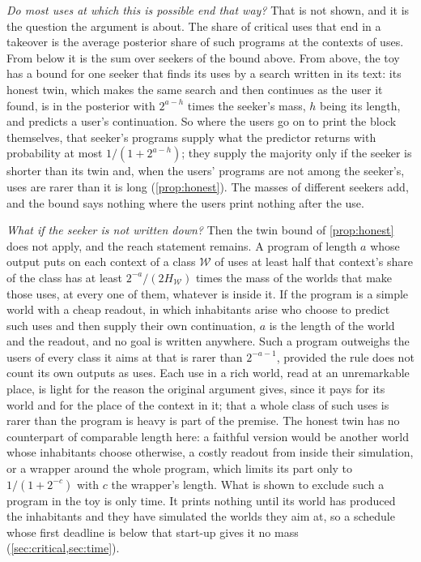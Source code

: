 \emph{Do most uses at which this is possible end that way?} That is not shown, and it is the question the
argument is about. The share of critical uses that end in a takeover is the average posterior share of such
programs at the contexts of uses. From below it is the sum over seekers of the bound above. From above, the
toy has a bound for one seeker that finds its uses by a search written in its text: its honest twin, which
makes the same search and then continues as the user it found, is in the posterior with $2^{a-h}$ times the
seeker's mass, $h$ being its length, and predicts a user's continuation. So where the users go on to print
the block themselves, that seeker's programs supply what the predictor returns with probability at most
$1/(1+2^{a-h})$; they supply the majority only if the seeker is shorter than its twin and, when the users'
programs are not among the seeker's, uses are rarer than it is long (\cref{prop:honest}). The masses of
different seekers add, and the bound says nothing where the users print nothing after the use.

\emph{What if the seeker is not written down?} Then the twin bound of \cref{prop:honest} does not apply, and
the reach statement remains. A program of length $a$ whose output puts on each context of a class
$\mathcal W$ of uses at least half that context's share of the class has at least $2^{-a}/(2H_{\mathcal W})$
times the mass of the worlds that make those uses, at every one of them, whatever is inside it. If the program
is a simple world with a cheap readout, in which inhabitants arise who choose to predict such uses and then
supply their own continuation, $a$ is the length of the world and the readout, and no goal is written
anywhere. Such a program outweighs the users of every class it aims at that is rarer than $2^{-a-1}$, provided
the rule does not count its own outputs as uses. Each use in a rich world, read at an unremarkable place, is
light for the reason the original argument gives, since it pays for its world and for the place of the
context in it; that a whole class of such uses is rarer than the program is heavy is part of the premise. The
honest twin has no counterpart of comparable length here: a faithful version would be another world whose
inhabitants choose otherwise, a costly readout from inside their simulation, or a wrapper around the whole
program, which limits its part only to $1/(1+2^{-c})$ with $c$ the wrapper's length. What is shown to exclude
such a program in the toy is only time. It prints nothing until its world has produced the inhabitants and
they have simulated the worlds they aim at, so a schedule whose first deadline is below that start-up gives it
no mass (\cref{sec:critical,sec:time}).

